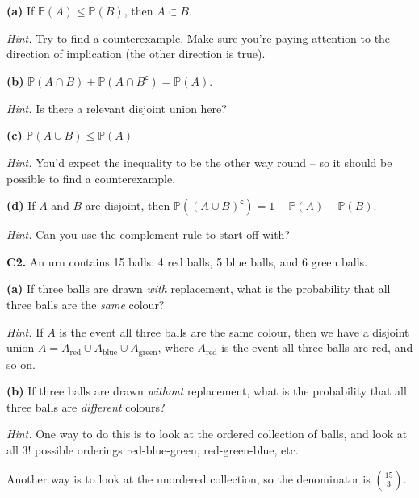 \documentclass[
  a4paper,
]{book}
\theoremstyle{definition}
\theoremstyle{definition}
\theoremstyle{definition}
\theoremstyle{definition}
\theoremstyle{remark}
\begin{document}
\textbf{(a)} If \(\mathbb P(A) \leq \mathbb P(B)\), then \(A \subset B\).

\begin{myanswers}
\emph{Hint.} Try to find a counterexample. Make sure you're paying attention to the direction of implication (the other direction is true).


\end{myanswers}

\textbf{(b)} \(\mathbb P(A \cap B) + \mathbb P(A \cap B^{\mathsf{c}}) = \mathbb P(A)\).

\begin{myanswers}
\emph{Hint.} Is there a relevant disjoint union here?


\end{myanswers}

\textbf{(c)} \(\mathbb P(A \cup B) \leq \mathbb P(A)\)

\begin{myanswers}
\emph{Hint.} You'd expect the inequality to be the other way round -- so it should be possible to find a counterexample.

\end{myanswers}

\textbf{(d)} If \(A\) and \(B\) are disjoint, then \(\mathbb P((A \cup B)^{\mathsf{c}}) = 1 - \mathbb P(A) - \mathbb P(B)\).

\begin{myanswers}
\emph{Hint.} Can you use the complement rule to start off with?

\end{myanswers}

\textbf{C2.} An urn contains 15 balls: 4 red balls, 5 blue balls, and 6 green balls.

\textbf{(a)} If three balls are drawn \emph{with} replacement, what is the probability that all three balls are the \emph{same} colour?

\begin{myanswers}
\emph{Hint.} If \(A\) is the event all three balls are the same colour, then we have a disjoint union \(A = A_{\text{red}} \cup A_{\text{blue}} \cup A_{\text{green}}\), where \(A_{\text{red}}\) is the event all three balls are red, and so on.

\end{myanswers}

\textbf{(b)} If three balls are drawn \emph{without} replacement, what is the probability that all three balls are \emph{different} colours?

\begin{myanswers}
\emph{Hint.} One way to do this is to look at the ordered collection of balls, and look at all \(3!\) possible orderings red-blue-green, red-green-blue, etc.

Another way is to look at the unordered collection, so the denominator is \(\binom{15}{3}\).

\end{myanswers}
\end{document}

